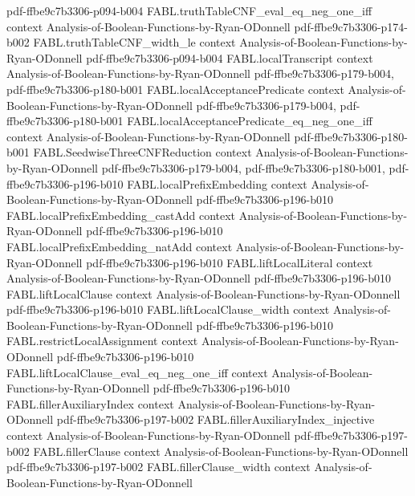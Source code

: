 \begin{theorem}
  {pdf-ffbe9c7b3306-p094-b004}
\proofstep
  {FABL.truthTableCNF_eval_eq_neg_one_iff}
  {context}
  {Analysis-of-Boolean-Functions-by-Ryan-ODonnell}
  {pdf-ffbe9c7b3306-p174-b002}
\proofstep
  {FABL.truthTableCNF_width_le}
  {context}
  {Analysis-of-Boolean-Functions-by-Ryan-ODonnell}
  {pdf-ffbe9c7b3306-p094-b004}
\proofstep
  {FABL.localTranscript}
  {context}
  {Analysis-of-Boolean-Functions-by-Ryan-ODonnell}
  {pdf-ffbe9c7b3306-p179-b004,
    pdf-ffbe9c7b3306-p180-b001}
\proofstep
  {FABL.localAcceptancePredicate}
  {context}
  {Analysis-of-Boolean-Functions-by-Ryan-ODonnell}
  {pdf-ffbe9c7b3306-p179-b004,
    pdf-ffbe9c7b3306-p180-b001}
\proofstep
  {FABL.localAcceptancePredicate_eq_neg_one_iff}
  {context}
  {Analysis-of-Boolean-Functions-by-Ryan-ODonnell}
  {pdf-ffbe9c7b3306-p180-b001}
\proofstep
  {FABL.SeedwiseThreeCNFReduction}
  {context}
  {Analysis-of-Boolean-Functions-by-Ryan-ODonnell}
  {pdf-ffbe9c7b3306-p179-b004,
    pdf-ffbe9c7b3306-p180-b001,
    pdf-ffbe9c7b3306-p196-b010}
\proofstep
  {FABL.localPrefixEmbedding}
  {context}
  {Analysis-of-Boolean-Functions-by-Ryan-ODonnell}
  {pdf-ffbe9c7b3306-p196-b010}
\proofstep
  {FABL.localPrefixEmbedding_castAdd}
  {context}
  {Analysis-of-Boolean-Functions-by-Ryan-ODonnell}
  {pdf-ffbe9c7b3306-p196-b010}
\proofstep
  {FABL.localPrefixEmbedding_natAdd}
  {context}
  {Analysis-of-Boolean-Functions-by-Ryan-ODonnell}
  {pdf-ffbe9c7b3306-p196-b010}
\proofstep
  {FABL.liftLocalLiteral}
  {context}
  {Analysis-of-Boolean-Functions-by-Ryan-ODonnell}
  {pdf-ffbe9c7b3306-p196-b010}
\proofstep
  {FABL.liftLocalClause}
  {context}
  {Analysis-of-Boolean-Functions-by-Ryan-ODonnell}
  {pdf-ffbe9c7b3306-p196-b010}
\proofstep
  {FABL.liftLocalClause_width}
  {context}
  {Analysis-of-Boolean-Functions-by-Ryan-ODonnell}
  {pdf-ffbe9c7b3306-p196-b010}
\proofstep
  {FABL.restrictLocalAssignment}
  {context}
  {Analysis-of-Boolean-Functions-by-Ryan-ODonnell}
  {pdf-ffbe9c7b3306-p196-b010}
\proofstep
  {FABL.liftLocalClause_eval_eq_neg_one_iff}
  {context}
  {Analysis-of-Boolean-Functions-by-Ryan-ODonnell}
  {pdf-ffbe9c7b3306-p196-b010}
\proofstep
  {FABL.fillerAuxiliaryIndex}
  {context}
  {Analysis-of-Boolean-Functions-by-Ryan-ODonnell}
  {pdf-ffbe9c7b3306-p197-b002}
\proofstep
  {FABL.fillerAuxiliaryIndex_injective}
  {context}
  {Analysis-of-Boolean-Functions-by-Ryan-ODonnell}
  {pdf-ffbe9c7b3306-p197-b002}
\proofstep
  {FABL.fillerClause}
  {context}
  {Analysis-of-Boolean-Functions-by-Ryan-ODonnell}
  {pdf-ffbe9c7b3306-p197-b002}
\proofstep
  {FABL.fillerClause_width}
  {context}
  {Analysis-of-Boolean-Functions-by-Ryan-ODonnell}

\end{theorem}
